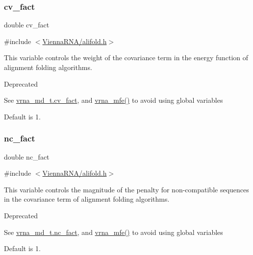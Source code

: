 \subsubsection{\texorpdfstring{cv\+\_\+fact}{cv\_fact}}
{\footnotesize\ttfamily double cv\+\_\+fact}



{\ttfamily \#include $<$\mbox{\hyperlink{alifold_8h}{Vienna\+R\+N\+A/alifold.\+h}}$>$}



This variable controls the weight of the covariance term in the energy function of alignment folding algorithms. 

\begin{DoxyRefDesc}{Deprecated}
\item[\mbox{\hyperlink{deprecated__deprecated000016}{Deprecated}}]See \mbox{\hyperlink{group__model__details_a62ebefb9d0643e5c4c8a2ec84a105ce6}{vrna\+\_\+md\+\_\+t.\+cv\+\_\+fact}}, and \mbox{\hyperlink{group__mfe__fold_gabd3b147371ccf25c577f88bbbaf159fd}{vrna\+\_\+mfe()}} to avoid using global variables\end{DoxyRefDesc}


Default is 1. \mbox{\label{group__consensus__fold_ga502948a122a2af5b914355b1f3ea2f61}} 
\subsubsection{\texorpdfstring{nc\+\_\+fact}{nc\_fact}}
{\footnotesize\ttfamily double nc\+\_\+fact}



{\ttfamily \#include $<$\mbox{\hyperlink{alifold_8h}{Vienna\+R\+N\+A/alifold.\+h}}$>$}



This variable controls the magnitude of the penalty for non-\/compatible sequences in the covariance term of alignment folding algorithms. 

\begin{DoxyRefDesc}{Deprecated}
\item[\mbox{\hyperlink{deprecated__deprecated000017}{Deprecated}}]See \mbox{\hyperlink{group__model__details_abcf568e6124bfcb2f847ff4eb0dfded6}{vrna\+\_\+md\+\_\+t.\+nc\+\_\+fact}}, and \mbox{\hyperlink{group__mfe__fold_gabd3b147371ccf25c577f88bbbaf159fd}{vrna\+\_\+mfe()}} to avoid using global variables\end{DoxyRefDesc}


Default is 1. 